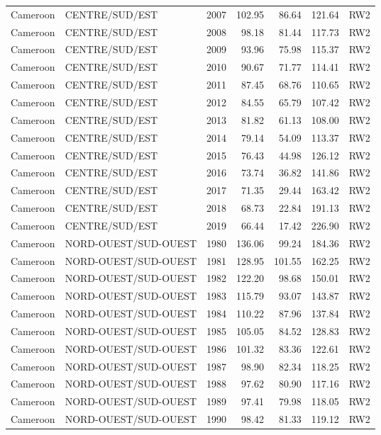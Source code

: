 \begin{longtable}{lllrrrl}
  Cameroon & CENTRE/SUD/EST & 2007 & 102.95 & 86.64 & 121.64 & RW2 \\ 
  Cameroon & CENTRE/SUD/EST & 2008 & 98.18 & 81.44 & 117.73 & RW2 \\ 
  Cameroon & CENTRE/SUD/EST & 2009 & 93.96 & 75.98 & 115.37 & RW2 \\ 
  Cameroon & CENTRE/SUD/EST & 2010 & 90.67 & 71.77 & 114.41 & RW2 \\ 
  Cameroon & CENTRE/SUD/EST & 2011 & 87.45 & 68.76 & 110.65 & RW2 \\ 
  Cameroon & CENTRE/SUD/EST & 2012 & 84.55 & 65.79 & 107.42 & RW2 \\ 
  Cameroon & CENTRE/SUD/EST & 2013 & 81.82 & 61.13 & 108.00 & RW2 \\ 
  Cameroon & CENTRE/SUD/EST & 2014 & 79.14 & 54.09 & 113.37 & RW2 \\ 
  Cameroon & CENTRE/SUD/EST & 2015 & 76.43 & 44.98 & 126.12 & RW2 \\ 
  Cameroon & CENTRE/SUD/EST & 2016 & 73.74 & 36.82 & 141.86 & RW2 \\ 
  Cameroon & CENTRE/SUD/EST & 2017 & 71.35 & 29.44 & 163.42 & RW2 \\ 
  Cameroon & CENTRE/SUD/EST & 2018 & 68.73 & 22.84 & 191.13 & RW2 \\ 
  Cameroon & CENTRE/SUD/EST & 2019 & 66.44 & 17.42 & 226.90 & RW2 \\ 
  Cameroon & NORD-OUEST/SUD-OUEST & 1980 & 136.06 & 99.24 & 184.36 & RW2 \\ 
  Cameroon & NORD-OUEST/SUD-OUEST & 1981 & 128.95 & 101.55 & 162.25 & RW2 \\ 
  Cameroon & NORD-OUEST/SUD-OUEST & 1982 & 122.20 & 98.68 & 150.01 & RW2 \\ 
  Cameroon & NORD-OUEST/SUD-OUEST & 1983 & 115.79 & 93.07 & 143.87 & RW2 \\ 
  Cameroon & NORD-OUEST/SUD-OUEST & 1984 & 110.22 & 87.96 & 137.84 & RW2 \\ 
  Cameroon & NORD-OUEST/SUD-OUEST & 1985 & 105.05 & 84.52 & 128.83 & RW2 \\ 
  Cameroon & NORD-OUEST/SUD-OUEST & 1986 & 101.32 & 83.36 & 122.61 & RW2 \\ 
  Cameroon & NORD-OUEST/SUD-OUEST & 1987 & 98.90 & 82.34 & 118.25 & RW2 \\ 
  Cameroon & NORD-OUEST/SUD-OUEST & 1988 & 97.62 & 80.90 & 117.16 & RW2 \\ 
  Cameroon & NORD-OUEST/SUD-OUEST & 1989 & 97.41 & 79.98 & 118.05 & RW2 \\ 
  Cameroon & NORD-OUEST/SUD-OUEST & 1990 & 98.42 & 81.33 & 119.12 & RW2 \\ 

\end{longtable}
